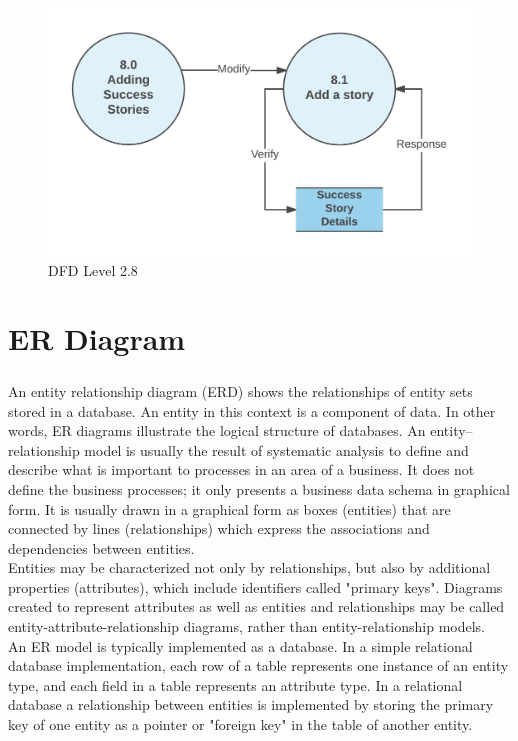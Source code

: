 \documentclass[12pt]{report}
\begin{document}
\begin{figure}[!htb]
    \centering
    \includegraphics[width=.7\textwidth]{df-l2-8.png}
    \caption{DFD Level 2.8}
    \label{fig:dfd l2.8}
\end{figure}


\chapter{ER Diagram}

\paragraph{}
An entity relationship diagram (ERD) shows the relationships of entity sets stored in a database. An entity in this context is a component of data. In other words, ER diagrams illustrate the logical structure of databases. An entity–relationship model is usually the result of systematic analysis to define and describe what is important to processes in an area of a business. It does not define the business processes; it only presents a business data schema in graphical form. It is usually drawn in a graphical form as boxes (entities) that are connected by lines (relationships) which express the associations and dependencies between entities. \\
 
Entities may be characterized not only by relationships, but also by additional properties (attributes), which include identifiers called "primary keys". Diagrams created to represent attributes as well as entities and relationships may be called entity-attribute-relationship diagrams, rather than entity-relationship models.\\
 
An ER model is typically implemented as a database. In a simple relational database implementation, each row of a table represents one instance of an entity type, and each field in a table represents an attribute type. In a relational database a relationship between entities is implemented by storing the primary key of one entity as a pointer or "foreign key" in the table of another entity.\\
\end{document}
